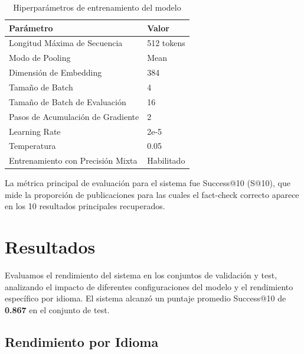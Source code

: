 \documentclass[a4paper,openany]{memoir}
\begin{document}
\begin{table}[htbp]
\centering
\caption{Hiperparámetros de entrenamiento del modelo}
\label{tab:hyperparams}
\begin{tabular}{ll}
\toprule
\textbf{Parámetro} & \textbf{Valor} \\
\midrule
Longitud Máxima de Secuencia & 512 tokens \\
Modo de Pooling & Mean \\
Dimensión de Embedding & 384 \\
Tamaño de Batch & 4 \\
Tamaño de Batch de Evaluación & 16 \\
Pasos de Acumulación de Gradiente & 2 \\
Learning Rate & 2e-5 \\
Temperatura & 0.05 \\
Entrenamiento con Precisión Mixta & Habilitado \\
\bottomrule
\end{tabular}
\end{table}

La métrica principal de evaluación para el sistema fue Success@10 (S@10), que mide la proporción de publicaciones para las cuales el fact-check correcto aparece en los 10 resultados principales recuperados.

\chapter{Resultados}

Evaluamos el rendimiento del sistema en los conjuntos de validación y test, analizando el impacto de diferentes configuraciones del modelo y el rendimiento específico por idioma. El sistema alcanzó un puntaje promedio Success@10 de \textbf{0.867} en el conjunto de test.

\section{Rendimiento por Idioma}
\end{document}
